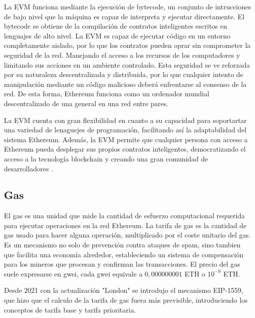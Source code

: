 La EVM funciona mediante la ejecución de bytecode, un conjunto de intrucciones de bajo nivel que la máquina es capaz de interpreta y ejecutar directamente.
El bytecode se obtiene de la compilación de contratos inteligentes escritos en lenguajes de alto nivel. 
La EVM es capaz de ejecutar código en un entorno completamente aislado, por lo que los contratos pueden oprar sin comprometer la seguridad de la red. Manejando el acceso a los recursos de los computadores y limitando sus acciones en un ambiente controlado.
Esta seguridad se ve reforzada por su naturaleza descentralizada y distribuida, por lo que cualquier intento de manipulación mediante un código malicioso deberá enfrentarse al consenso de la red.
De esta forma, Ethereum funciona como un ordenador mundial descentralizado de una general en una red entre pares.

La EVM cuenta con gran flexibilidad en cuanto a su capacidad para soportartar una variedad de lenaguejes de programación, facilitando así la adaptabilidad del sistema Ethereum.
Además, la EVM permite que cualquier persona con acceso a Ethereum pueda desplegar sus propios contratos inteligentes, democratizando el acceso a la tecnología blockchain y creando una gran comunidad de desarrolladores \cite{ComoFuncionaEVM}.


\subsection{Gas}

El gas es una unidad que mide la cantidad de esfuerzo computacional requerida para ejecutar operaciones en la red Ethereum.
La tarifa de gas es la cantidad de gas usado para hacer alguna operación, multiplicado por el coste unitario del gas.
Es un mecanismo no solo de prevención contra ataques de spam, sino tambien que facilita una economía alrededor, estableciendo un sistema de compensación para los mineros que procesan y confirman las transacciones.
El precio del gas suele expresarse en gwei, cada gwei equivale a \(0,000000001\) ETH o \(10^{-9}\) ETH.

Desde 2021 con la actualización "London" se introdujo el mecanismo EIP-1559, que hizo que el calculo de la tarifa de gas fuera más previsible, introduciendo los conceptos de tarifa 
base y tarifa prioritaria.

